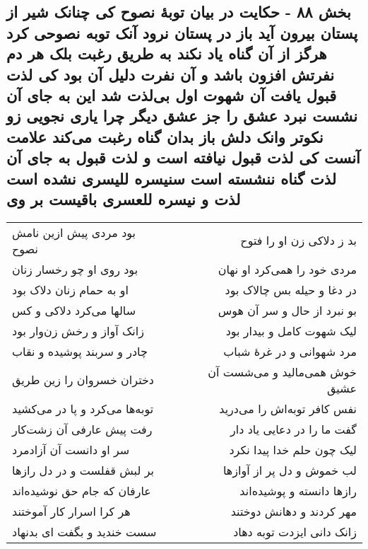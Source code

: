 \begin{center}
\section*{بخش ۸۸ - حکایت در بیان توبهٔ نصوح کی چنانک شیر از پستان بیرون آید باز در پستان نرود آنک توبه نصوحی کرد هرگز از آن گناه یاد نکند به طریق رغبت بلک هر دم نفرتش افزون باشد و آن نفرت دلیل آن بود  کی لذت قبول یافت آن شهوت اول بی‌لذت شد این به جای آن نشست نبرد عشق را جز عشق دیگر  چرا یاری نجویی زو نکوتر وانک دلش باز بدان گناه رغبت می‌کند علامت آنست کی لذت قبول نیافته است و لذت قبول به جای آن لذت گناه ننشسته است سنیسره للیسری نشده است لذت و نیسره للعسری باقیست بر وی}
\label{sec:sh088}
\begin{longtable}{l p{0.5cm} r}
بود مردی پیش ازین نامش نصوح
&&
بد ز دلاکی زن او را فتوح
\\
بود روی او چو رخسار زنان
&&
مردی خود را همی‌کرد او نهان
\\
او به حمام زنان دلاک بود
&&
در دغا و حیله بس چالاک بود
\\
سالها می‌کرد دلاکی و کس
&&
بو نبرد از حال و سر آن هوس
\\
زانک آواز و رخش زن‌وار بود
&&
لیک شهوت کامل و بیدار بود
\\
چادر و سربند پوشیده و نقاب
&&
مرد شهوانی و در غرهٔ شباب
\\
دختران خسروان را زین طریق
&&
خوش همی‌مالید و می‌شست آن عشیق
\\
توبه‌ها می‌کرد و پا در می‌کشید
&&
نفس کافر توبه‌اش را می‌درید
\\
رفت پیش عارفی آن زشت‌کار
&&
گفت ما را در دعایی یاد دار
\\
سر او دانست آن آزادمرد
&&
لیک چون حلم خدا پیدا نکرد
\\
بر لبش قفلست و در دل رازها
&&
لب خموش و دل پر از آوازها
\\
عارفان که جام حق نوشیده‌اند
&&
رازها دانسته و پوشیده‌اند
\\
هر کرا اسرار کار آموختند
&&
مهر کردند و دهانش دوختند
\\
سست خندید و بگفت ای بدنهاد
&&
زانک دانی ایزدت توبه دهاد
\\
\end{longtable}
\end{center}
